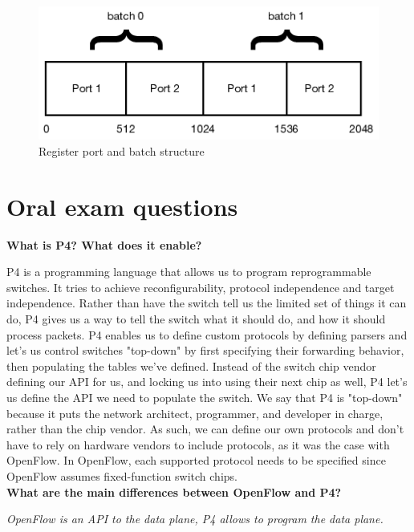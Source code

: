 \documentclass[11pt,oneside,a4paper]{article}
\begin{document}
\begin{figure}
	\centering
	\includegraphics[width=0.7\linewidth]{figures/ex06-register-structure}
	\caption{Register port and batch structure}
	\label{fig:ex06-register-structure}
\end{figure}


\newpage

\section{Oral exam questions}

\noindent \textbf{What is P4? What does it enable?}

P4 is a programming language that allows us to program reprogrammable switches. It tries to achieve reconfigurability, protocol independence and target independence. Rather than have the switch tell us the limited set of things it can do, P4 gives us a way to tell the switch what it should do, and how it should process packets.
P4 enables us to define custom protocols by defining parsers and let's us control switches "top-down" by first specifying their forwarding behavior, then populating the tables we've defined. Instead of the switch chip vendor defining our API for us, and locking us into using their next chip as well, P4 let's us define the API we need to populate the switch. We say that P4 is "top-down" because it puts the network architect, programmer, and developer in charge, rather than the chip vendor.
As such, we can define our own protocols and don't have to rely on hardware vendors to include protocols, as it was the case with OpenFlow. In OpenFlow, each supported protocol needs to be specified since OpenFlow assumes fixed-function switch chips.\\

\noindent \textbf{What are the main differences between OpenFlow and P4?}

\textit{OpenFlow is an API to the data plane, P4 allows to program the data plane.}
\end{document}
